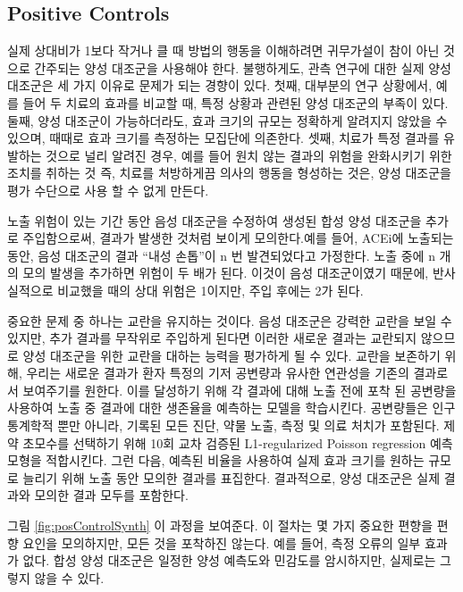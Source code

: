 \documentclass[11pt]{book}
\theoremstyle{definition}
\theoremstyle{definition}
\theoremstyle{definition}
\theoremstyle{remark}
\begin{document}
\subsection{Positive Controls}\label{PositiveControls}


실제 상대비가 1보다 작거나 클 때 방법의 행동을 이해하려면 귀무가설이
참이 아닌 것으로 간주되는 양성 대조군을 사용해야 한다. 불행하게도, 관측
연구에 대한 실제 양성 대조군은 세 가지 이유로 문제가 되는 경향이 있다.
첫째, 대부분의 연구 상황에서, 예를 들어 두 치료의 효과를 비교할 때, 특정
상황과 관련된 양성 대조군의 부족이 있다. 둘째, 양성 대조군이
가능하더라도, 효과 크기의 규모는 정확하게 알려지지 않았을 수 있으며,
때때로 효과 크기를 측정하는 모집단에 의존한다. 셋째, 치료가 특정 결과를
유발하는 것으로 널리 알려진 경우, 예를 들어 원치 않는 결과의 위험을
완화시키기 위한 조치를 취하는 것 즉, 치료를 처방하게끔 의사의 행동을
형성하는 것은, 양성 대조군을 평가 수단으로 사용 할 수 없게 만든다.
\citep{noren_2014}


노출 위험이 있는 기간 동안 음성 대조군을 수정하여 생성된 합성 양성
대조군을 추가로 주입함으로써, \citep{schuemie_2018} 결과가 발생한 것처럼
보이게 모의한다.예를 들어, ACEi에 노출되는 동안, 음성 대조군의 결과
``내성 손톱''이 n 번 발견되었다고 가정한다. 노출 중에 n 개의 모의 발생을
추가하면 위험이 두 배가 된다. 이것이 음성 대조군이였기 때문에,
반사실적으로 비교했을 때의 상대 위험은 1이지만, 주입 후에는 2가 된다.

중요한 문제 중 하나는 교란을 유지하는 것이다. 음성 대조군은 강력한
교란을 보일 수 있지만, 추가 결과를 무작위로 주입하게 된다면 이러한
새로운 결과는 교란되지 않으므로 양성 대조군을 위한 교란을 대하는 능력을
평가하게 될 수 있다. 교란을 보존하기 위해, 우리는 새로운 결과가 환자
특정의 기저 공변량과 유사한 연관성을 기존의 결과로서 보여주기를 원한다.
이를 달성하기 위해 각 결과에 대해 노출 전에 포착 된 공변량을 사용하여
노출 중 결과에 대한 생존율을 예측하는 모델을 학습시킨다. 공변량들은 인구
통계학적 뿐만 아니라, 기록된 모든 진단, 약물 노출, 측정 및 의료 처치가
포함된다. 제약 초모수를 선택하기 위해 10회 교차 검증된 L1-regularized
Poisson regression \citep{suchard_2013} 예측 모형을 적합시킨다. 그런
다음, 예측된 비율을 사용하여 실제 효과 크기를 원하는 규모로 늘리기 위해
노출 동안 모의한 결과를 표집한다. 결과적으로, 양성 대조군은 실제 결과와
모의한 결과 모두를 포함한다.

그림 \ref{fig:posControlSynth} 이 과정을 보여준다. 이 절차는 몇 가지
중요한 편향을 편향 요인을 모의하지만, 모든 것을 포착하진 않는다. 예를
들어, 측정 오류의 일부 효과가 없다. 합성 양성 대조군은 일정한 양성
예측도와 민감도를 암시하지만, 실제로는 그렇지 않을 수 있다.
\end{document}
